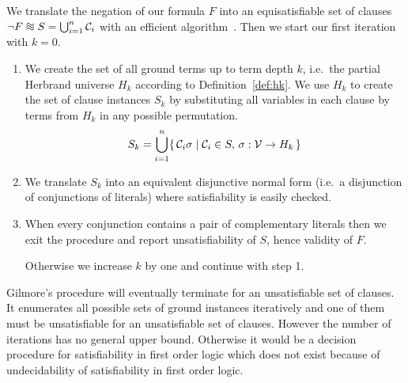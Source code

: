 
\begin{procedure}\label{proc:gilmore's:prover}
	We translate the negation of our formula \( F \) into an equisatisfiable set of clauses
	\( \lnot F \equisat S = \bigcup_{i=1}^{n} \mcC_i \) with an efficient algorithm~\cite{tseitin70, PLAISTED1986293}.
	Then we start our first iteration with \( k=0 \).
	\begin{enumerate}

		\item We create the set of all ground terms up to term depth \( k \),
		i.e.~the partial Herbrand universe \( H_k \) according to Definition~\ref{def:hk}.
		We use \( H_k \) to create the set of clause instances \( S_k \)
		by substituting all variables
		in each clause by terms from \( H_k \) in any possible permutation.
		\[ S_k = \bigcup_{i=1}^{n}
		 \{ \,
		\mathcal{C}_i\sigma \mid \mathcal{C}_i \in S, \, \sigma: \mathcal{V}\to H_k
		 \, \}
		\]

		\item We translate \( S_k \) into an equivalent disjunctive normal form
		(i.e.~a disjunction of conjunctions of literals)
		where satisfiability is easily checked.



		\item When every conjunction contains a pair of complementary literals
		then we exit the procedure and report unsatisfiability of \( S \),
		hence validity of \( F \).

		Otherwise we increase \( k \) by one and continue with step 1.
	\end{enumerate}
\end{procedure}

Gilmore's procedure will eventually terminate for an unsatisfiable set of clauses.
It enumerates all possible sets of ground instances iteratively
and one of them must be unsatisfiable for an unsatisfiable set of clauses.
However the number of iterations has no general upper bound.
Otherwise it would be a decision procedure for satisfiability in first order logic
which does not exist because of undecidability of satisfiability in first order logic.

